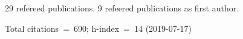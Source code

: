 29 refereed publications. 9 refeered publications as first author.

Total citations~=~690; h-index~=~14 (2019-07-17)
